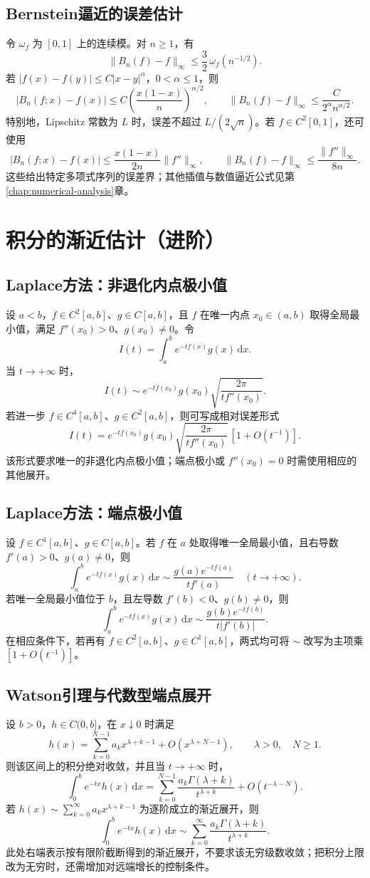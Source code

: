 \documentclass[../main.tex]{subfiles}
\begin{document}
\subsection{Bernstein逼近的误差估计}
令 $\omega_f$ 为 $[0,1]$ 上的连续模。对 $n\ge1$，有
\[
\|B_n(f)-f\|_\infty
\le\frac32\,\omega_f(n^{-1/2}).
\]
若 $|f(x)-f(y)|\le C|x-y|^\alpha$，$0<\alpha\le1$，则
\[
|B_n(f;x)-f(x)|
\le C\left(\frac{x(1-x)}n\right)^{\alpha/2},\qquad
\|B_n(f)-f\|_\infty\le\frac C{2^\alpha n^{\alpha/2}}.
\]
特别地，Lipschitz 常数为 $L$ 时，误差不超过 $L/(2\sqrt n)$。若 $f\in C^2[0,1]$，还可使用
\[
|B_n(f;x)-f(x)|\le\frac{x(1-x)}{2n}\|f''\|_\infty,
\qquad
\|B_n(f)-f\|_\infty\le\frac{\|f''\|_\infty}{8n}.
\]
这些给出特定多项式序列的误差界；其他插值与数值逼近公式见第\ref{chap:numerical-analysis}章。
\section{积分的渐近估计（进阶）}
\subsection{Laplace方法：非退化内点极小值}
设 $a<b$，$f\in C^2[a,b]$、$g\in C[a,b]$，且 $f$ 在唯一内点 $x_0\in(a,b)$ 取得全局最小值，满足 $f''(x_0)>0$、$g(x_0)\ne0$。令
\[
I(t)=\int_a^be^{-tf(x)}g(x)\,\mathrm dx.
\]
当 $t\to+\infty$ 时，
\[
I(t)\sim e^{-tf(x_0)}g(x_0)
\sqrt{\frac{2\pi}{t f''(x_0)}}.
\]
若进一步 $f\in C^4[a,b]$、$g\in C^2[a,b]$，则可写成相对误差形式
\[
I(t)=e^{-tf(x_0)}g(x_0)
\sqrt{\frac{2\pi}{t f''(x_0)}}\,[1+O(t^{-1})].
\]
该形式要求唯一的非退化内点极小值；端点极小或 $f''(x_0)=0$ 时需使用相应的其他展开。
\subsection{Laplace方法：端点极小值}
设 $f\in C^1[a,b]$、$g\in C[a,b]$。若 $f$ 在 $a$ 处取得唯一全局最小值，且右导数 $f'(a)>0$、$g(a)\ne0$，则
\[
\int_a^be^{-tf(x)}g(x)\,\mathrm dx
\sim\frac{g(a)e^{-tf(a)}}{t f'(a)}\quad(t\to+\infty).
\]
若唯一全局最小值位于 $b$，且左导数 $f'(b)<0$、$g(b)\ne0$，则
\[
\int_a^be^{-tf(x)}g(x)\,\mathrm dx
\sim\frac{g(b)e^{-tf(b)}}{t|f'(b)|}.
\]
在相应条件下，若再有 $f\in C^2[a,b]$、$g\in C^1[a,b]$，两式均可将 $\sim$ 改写为主项乘 $[1+O(t^{-1})]$。
\subsection{Watson引理与代数型端点展开}
设 $b>0$，$h\in C(0,b]$，在 $x\downarrow0$ 时满足
\[
h(x)=\sum_{k=0}^{N-1}a_kx^{\lambda+k-1}
+O(x^{\lambda+N-1}),\qquad \lambda>0,\quad N\ge1.
\]
则该区间上的积分绝对收敛，并且当 $t\to+\infty$ 时，
\[
\int_0^be^{-tx}h(x)\,\mathrm dx
=\sum_{k=0}^{N-1}\frac{a_k\Gamma(\lambda+k)}{t^{\lambda+k}}
+O(t^{-\lambda-N}).
\]
若 $h(x)\sim\sum_{k=0}^\infty a_kx^{\lambda+k-1}$ 为逐阶成立的渐近展开，则
\[
\int_0^be^{-tx}h(x)\,\mathrm dx
\sim\sum_{k=0}^\infty\frac{a_k\Gamma(\lambda+k)}{t^{\lambda+k}}.
\]
此处右端表示按有限阶截断得到的渐近展开，不要求该无穷级数收敛；把积分上限改为无穷时，还需增加对远端增长的控制条件。
\end{document}

